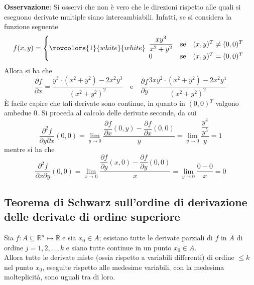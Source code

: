 \documentclass[a4paper]{extarticle}
\begin{document}
\vspace{1em}
\noindent
\textbf{Osservazione}: Si osservi che non è vero che le direzioni rispetto alle quali si eseguono derivate multiple siano intercambiabili. Infatti, se si considera la funzione seguente
\[
    f(x,y) = \left\{
        \rowcolors{1}{white}{white}    
        \begin{array}{lll}
            \dfrac{xy^3}{x^2+y^2} & \text{se} & (x,y){^T} \neq (0,0){^T}\\
            0   & \text{se} & (x,y){^T} = (0,0){^T}\\
        \end{array}
    \right.
\]
Allora si ha che
\[\dfrac{\partial f}{\partial x} = \dfrac{y^3 \cdot (x^2+y^2) - 2x^2y^3}{(x^2+y^2)^2} \hspace{1em} \text{e} \hspace{1em} \dfrac{\partial f}{\partial y} \dfrac{3xy^2 \cdot (x^2+y^2) - 2x^2y^4}{(x^2+y^2)^2}\]
È facile capire che tali derivate sono continue, in quanto in $(0,0){^T}$ valgono ambedue $0$. Si proceda al calcolo delle derivate seconde, da cui
\[\dfrac{\partial^2 f}{\partial y \partial x}(0,0) = \lim_{y \to 0} \dfrac{\dfrac{\partial f}{\partial x}(0,y) - \dfrac{\partial f}{\partial x}(0,0)}{y} = \lim_{y \to 0} \dfrac{\dfrac{y^4}{y^5}}{y} = 1\]
mentre si ha che
\[\dfrac{\partial^2 f}{\partial x \partial y}(0,0) = \lim_{x \to 0} \dfrac{\dfrac{\partial f}{\partial y}(x,0) - \dfrac{\partial f}{\partial y}(0,0)}{x} = \lim_{y \to 0} \dfrac{0-0}{x} = 0\]

\vspace{2em}
\subsection{Teorema di Schwarz sull'ordine di derivazione delle derivate di ordine superiore}
Sia $f : A \subseteq \mathbb{R}^n \longmapsto \mathbb{R}$ e sia $x_0 \in A$; esistano tutte le derivate parziali di $f$ in $A$ di ordine $j=1,2,\dots,k$ e siano tutte continue in un punto $x_0 \in A$.\\
Allora tutte le derivate miste (ossia rispetto a variabili differenti) di ordine $\leq k$ nel punto $x_0$, eseguite rispetto alle medesime variabili, con la medesima molteplicità, sono uguali tra di loro. 
\end{document}
